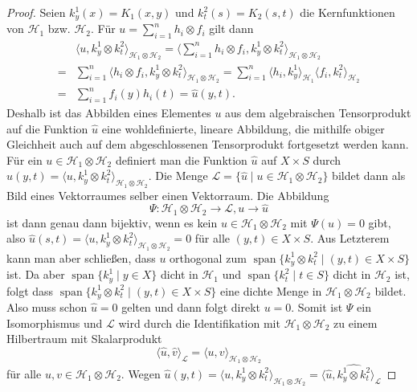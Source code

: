 \documentclass[12pt,titlepage,twoside,cleardoublepage]{article}
\theoremstyle{nummermitklammern}
\numberwithin{equation}{section}
\DeclareMathOperator{\Span}{span}
\begin{document}
\begin{proof}
Seien $k_y^1(x)=K_1(x,y)$ und $k^2_t(s)=K_2(s,t)$ die Kernfunktionen von $\mathcal{H}_1$ bzw. $\mathcal{H}_2$. Für $u=\sum_{i=1}^n h_i\otimes f_i$ gilt dann 
\begin{align*}
&\langle u,k^1_y\otimes k_t^2 \rangle_{\mathcal{H}_1\otimes \mathcal{H}_2}=\langle \sum_{i=1}^n h_i\otimes f_i,k^1_y\otimes k_t^2 \rangle_{\mathcal{H}_1\otimes \mathcal{H}_2}\\
=&\sum_{i=1}^n\langle h_i\otimes f_i,k^1_y\otimes k_t^2 \rangle_{\mathcal{H}_1\otimes \mathcal{H}_2} 
=\sum_{i=1}^n\langle h_i,k^1_y \rangle_{\mathcal{H}_1}\langle f_i,k_t^2 \rangle_{ \mathcal{H}_2}\\
=&\sum_{i=1}^nf_i(y)h_i(t)
=\hat{u}(y,t).
\end{align*}
Deshalb ist das Abbilden eines Elementes $u$ aus dem algebraischen Tensorprodukt auf die Funktion $\hat{u}$ eine wohldefinierte, lineare Abbildung, die mithilfe obiger Gleichheit auch auf dem abgeschlossenen Tensorprodukt fortgesetzt werden kann.
 Für ein $u \in \mathcal{H}_1\otimes \mathcal{H}_2$ definiert man die Funktion $\hat{u}$ auf $X\times S$ durch $\hat{u}(y,t)=\langle u,k^1_y \otimes k^2_t \rangle_{\mathcal{H}_1\otimes \mathcal{H}_2}.$ Die Menge $\mathcal{L}=\{\hat{u}\mid u\in \mathcal{H}_1\otimes \mathcal{H}_2\}$ bildet dann als Bild eines Vektorraumes selber einen Vektorraum. Die Abbildung
 \[
\Psi:\mathcal{H}_1\otimes \mathcal{H}_2 \to \mathcal{L},u\to \hat{u}
 \] ist dann genau dann bijektiv, wenn es kein $u \in\mathcal{H}_1\otimes \mathcal{H}_2$ mit $\Psi(u)=0$ gibt, also $\hat{u}(s,t)=\langle u,k^1_y \otimes k^2_t \rangle_{\mathcal{H}_1\otimes \mathcal{H}_2}=0$ für alle $(y,t)\in X\times S.$
  Aus Letzterem kann man aber schließen, dass $u$ orthogonal zum $\Span\{k_y^1\otimes k_t^2\mid (y,t)\in X\times S\}$ ist. 
  Da aber $\Span\{k_y^1\mid y\in X\}$ dicht in $\mathcal{H}_1$ und 
$\Span\{k_t^2\mid t\in S\}$ dicht in $\mathcal{H}_2$ ist, folgt dass $\Span\{k_y^1\otimes k_t^2\mid (y,t)\in X\times S\}$ eine dichte Menge in $\mathcal{H}_1\otimes \mathcal{H}_2$ bildet. Also muss schon $\hat{u}=0$ gelten und dann folgt direkt $u=0$. Somit ist $\Psi$ ein Isomorphismus und $\mathcal{L}$ wird durch die Identifikation mit $\mathcal{H}_1\otimes \mathcal{H}_2$ zu einem Hilbertraum mit Skalarprodukt 
\[
\langle \hat{u},\hat{v}\rangle_{\mathcal{L}}=\langle u,v\rangle_{\mathcal{H}_1\otimes \mathcal{H}_2}
\] für alle $u,v\in \mathcal{H}_1\otimes \mathcal{H}_2.$ Wegen $\hat{u}(y,t)
=\langle u,k_y^1\otimes k_t^2\rangle_{\mathcal{H}_1\otimes \mathcal{H}_2}=\langle \hat{u},\widehat{k_y^1\otimes k_t^2}\rangle_{\mathcal{L}}$

\end{proof}
\end{document}
